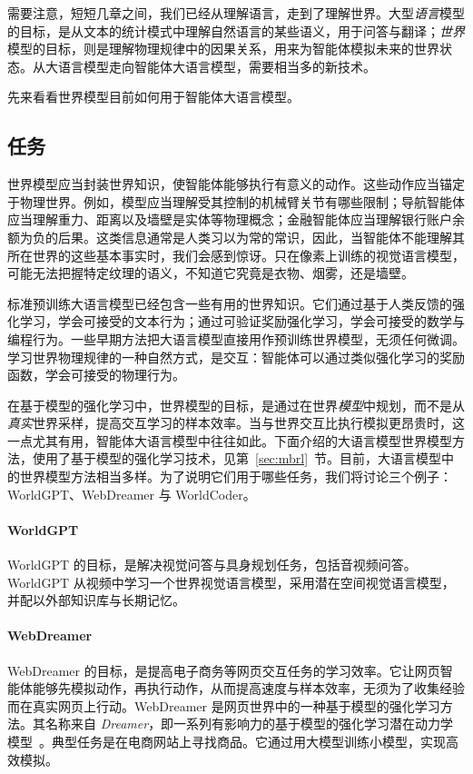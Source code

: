 需要注意，短短几章之间，我们已经从理解语言，走到了理解世界。大型{\em 语言}模型的目标，是从文本的统计模式中理解自然语言的某些语义，用于问答与翻译；{\em 世界}模型的目标，则是理解物理规律中的因果关系，用来为智能体模拟未来的世界状态。从大语言模型走向智能体大语言模型，需要相当多的新技术。

先来看看世界模型目前如何用于智能体大语言模型。

\subsection{任务}
世界模型应当封装世界知识，使智能体能够执行有意义的动作。这些动作应当锚定于物理世界。例如，模型应当理解受其控制的机械臂关节有哪些限制；导航智能体应当理解重力、距离以及墙壁是实体等物理概念；金融智能体应当理解银行账户余额为负的后果。这类信息通常是人类习以为常的常识，因此，当智能体不能理解其所在世界的这些基本事实时，我们会感到惊讶。只在像素上训练的视觉语言模型，可能无法把握特定纹理的语义，不知道它究竟是衣物、烟雾，还是墙壁。

标准预训练大语言模型已经包含一些有用的世界知识。它们通过基于人类反馈的强化学习，学会可接受的文本行为；通过可验证奖励强化学习，学会可接受的数学与编程行为。一些早期方法把大语言模型直接用作预训练世界模型，无须任何微调。学习世界物理规律的一种自然方式，是交互：智能体可以通过类似强化学习的奖励函数，学会可接受的物理行为。

在基于模型的强化学习中，世界模型的目标，是通过在世界{\em 模型}中规划，而不是从{\em 真实}世界采样，提高交互学习的样本效率。当与世界交互比执行模拟更昂贵时，这一点尤其有用，智能体大语言模型中往往如此。下面介绍的大语言模型世界模型方法，使用了基于模型的强化学习技术，见第~\ref{sec:mbrl}~节。目前，大语言模型中的世界模型方法相当多样。为了说明它们用于哪些任务，我们将讨论三个例子：WorldGPT、WebDreamer 与 WorldCoder。

\paragraph{WorldGPT}
WorldGPT \citep{ge2024worldgpt} 的目标，是解决视觉问答与具身规划任务，包括音视频问答。WorldGPT 从视频中学习一个世界视觉语言模型，采用潜在空间视觉语言模型，并配以外部知识库与长期记忆。

\paragraph{WebDreamer}
WebDreamer \citep{gu2024your} 的目标，是提高电子商务等网页交互任务的学习效率。它让网页智能体能够先模拟动作，再执行动作，从而提高速度与样本效率，无须为了收集经验而在真实网页上行动。WebDreamer 是网页世界中的一种基于模型的强化学习方法。其名称来自 {\em Dreamer}，即一系列有影响力的基于模型的强化学习潜在动力学模型~\citep{hafner2018learning,hafner2019dream,hafner2023mastering}。典型任务是在电商网站上寻找商品。它通过用大模型训练小模型，实现高效模拟。


